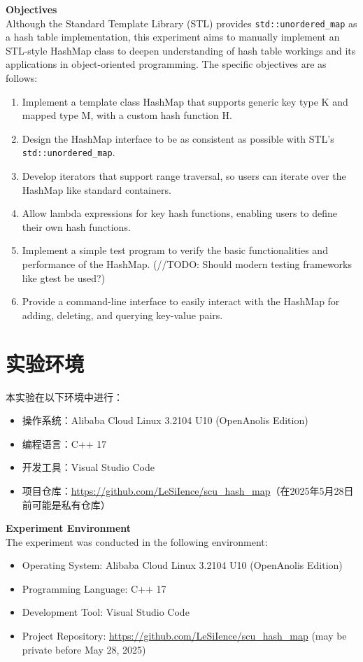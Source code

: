 \documentclass{article}
\begin{document}
    \bigskip
    \textbf{Objectives}\\
    Although the Standard Template Library (STL) provides \texttt{std::unordered\_map} as a hash table implementation, this experiment aims to manually implement an STL-style HashMap class to deepen understanding of hash table workings and its applications in object-oriented programming. The specific objectives are as follows:
    \begin{enumerate}
        \item Implement a template class HashMap that supports generic key type K and mapped type M, with a custom hash function H.
        \item Design the HashMap interface to be as consistent as possible with STL's \texttt{std::unordered\_map}.
        \item Develop iterators that support range traversal, so users can iterate over the HashMap like standard containers.
        \item Allow lambda expressions for key hash functions, enabling users to define their own hash functions.
        \item Implement a simple test program to verify the basic functionalities and performance of the HashMap. (//TODO: Should modern testing frameworks like gtest be used?)
        \item Provide a command-line interface to easily interact with the HashMap for adding, deleting, and querying key-value pairs.
    \end{enumerate}

\section{实验环境}
    本实验在以下环境中进行：
    \begin{itemize}
        \item 操作系统：Alibaba Cloud Linux 3.2104 U10 (OpenAnolis Edition)\\
        \item 编程语言：C++ 17\\
        \item 开发工具：Visual Studio Code\\ 
        \item 项目仓库：\url{https://github.com/LeSiIence/scu_hash_map}（在2025年5月28日前可能是私有仓库）\\ 
    \end{itemize}

    \bigskip
    \textbf{Experiment Environment}\\
    The experiment was conducted in the following environment:
    \begin{itemize}
        \item Operating System: Alibaba Cloud Linux 3.2104 U10 (OpenAnolis Edition)
        \item Programming Language: C++ 17
        \item Development Tool: Visual Studio Code
        \item Project Repository: \url{https://github.com/LeSiIence/scu_hash_map} (may be private before May 28, 2025)
    \end{itemize}
\end{document}
